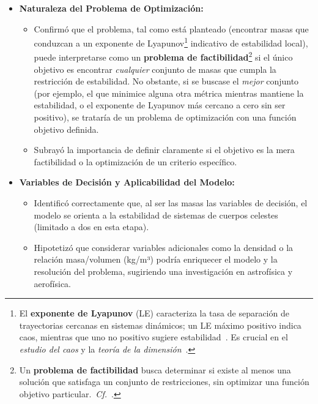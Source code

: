 \begin{itemize}
    \item \textbf{Naturaleza del Problema de Optimización:}
    \begin{itemize}
        \item Confirmó que el problema, tal como está planteado (encontrar masas que conduzcan a un exponente de Lyapunov\footnote{El \textbf{exponente de Lyapunov} (LE) caracteriza la tasa de separación de trayectorias cercanas en sistemas dinámicos; un LE máximo positivo indica caos, mientras que uno no positivo sugiere estabilidad~\cite{Kuznetsov2016, Quarles2011}. Es crucial en el \textit{estudio del caos} y la \textit{teoría de la dimensión}~\cite{Kuznetsov2016, KaplanYorke1979, Kuznetsov_2016}.} indicativo de estabilidad local), puede interpretarse como un \textbf{problema de factibilidad}\footnote{Un \textbf{problema de factibilidad} busca determinar si existe al menos una solución que satisfaga un conjunto de restricciones, sin optimizar una función objetivo particular.\ \textit{Cf.}~\cite{boyd2004convex}.} si el único objetivo es encontrar \textit{cualquier} conjunto de masas que cumpla la restricción de estabilidad. No obstante, si se buscase el \textit{mejor} conjunto (por ejemplo, el que minimice alguna otra métrica mientras mantiene la estabilidad, o el exponente de Lyapunov más cercano a cero sin ser positivo), se trataría de un problema de optimización con una función objetivo definida.
        \item Subrayó la importancia de definir claramente si el objetivo es la mera factibilidad o la optimización de un criterio específico.
    \end{itemize}

    \item \textbf{Variables de Decisión y Aplicabilidad del Modelo:}
    \begin{itemize}
        \item Identificó correctamente que, al ser las masas las variables de decisión, el modelo se orienta a la estabilidad de sistemas de cuerpos celestes (limitado a dos en esta etapa).
        \item Hipotetizó que considerar variables adicionales como la densidad o la relación masa/volumen (kg/m³) podría enriquecer el modelo y la resolución del problema, sugiriendo una investigación en astrofísica y aerofísica.
    \end{itemize}


\end{itemize}
